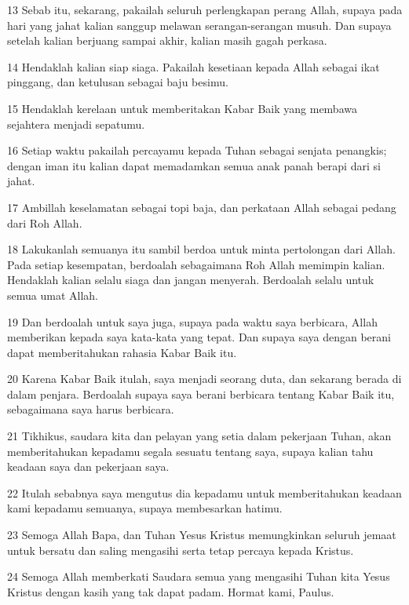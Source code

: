 \par 13 Sebab itu, sekarang, pakailah seluruh perlengkapan perang Allah, supaya pada hari yang jahat kalian sanggup melawan serangan-serangan musuh. Dan supaya setelah kalian berjuang sampai akhir, kalian masih gagah perkasa.
\par 14 Hendaklah kalian siap siaga. Pakailah kesetiaan kepada Allah sebagai ikat pinggang, dan ketulusan sebagai baju besimu.
\par 15 Hendaklah kerelaan untuk memberitakan Kabar Baik yang membawa sejahtera menjadi sepatumu.
\par 16 Setiap waktu pakailah percayamu kepada Tuhan sebagai senjata penangkis; dengan iman itu kalian dapat memadamkan semua anak panah berapi dari si jahat.
\par 17 Ambillah keselamatan sebagai topi baja, dan perkataan Allah sebagai pedang dari Roh Allah.
\par 18 Lakukanlah semuanya itu sambil berdoa untuk minta pertolongan dari Allah. Pada setiap kesempatan, berdoalah sebagaimana Roh Allah memimpin kalian. Hendaklah kalian selalu siaga dan jangan menyerah. Berdoalah selalu untuk semua umat Allah.
\par 19 Dan berdoalah untuk saya juga, supaya pada waktu saya berbicara, Allah memberikan kepada saya kata-kata yang tepat. Dan supaya saya dengan berani dapat memberitahukan rahasia Kabar Baik itu.
\par 20 Karena Kabar Baik itulah, saya menjadi seorang duta, dan sekarang berada di dalam penjara. Berdoalah supaya saya berani berbicara tentang Kabar Baik itu, sebagaimana saya harus berbicara.
\par 21 Tikhikus, saudara kita dan pelayan yang setia dalam pekerjaan Tuhan, akan memberitahukan kepadamu segala sesuatu tentang saya, supaya kalian tahu keadaan saya dan pekerjaan saya.
\par 22 Itulah sebabnya saya mengutus dia kepadamu untuk memberitahukan keadaan kami kepadamu semuanya, supaya membesarkan hatimu.
\par 23 Semoga Allah Bapa, dan Tuhan Yesus Kristus memungkinkan seluruh jemaat untuk bersatu dan saling mengasihi serta tetap percaya kepada Kristus.
\par 24 Semoga Allah memberkati Saudara semua yang mengasihi Tuhan kita Yesus Kristus dengan kasih yang tak dapat padam. Hormat kami, Paulus.


